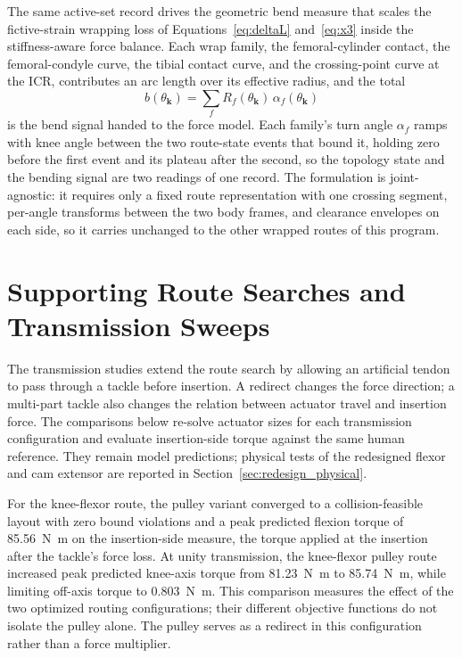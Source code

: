 The same active-set record drives the geometric bend measure that scales the fictive-strain wrapping loss of Equations~\eqref{eq:deltaL} and~\eqref{eq:x3} inside the stiffness-aware force balance. Each wrap family, the femoral-cylinder contact, the femoral-condyle curve, the tibial contact curve, and the crossing-point curve at the ICR, contributes an arc length over its effective radius, and the total
\begin{equation}
b(\theta_{\mathbf{k}}) = \sum_{f} R_{f}(\theta_{\mathbf{k}})\, \alpha_{f}(\theta_{\mathbf{k}})
\label{eq:app_bend_measure}
\end{equation}
is the bend signal handed to the force model. Each family's turn angle $\alpha_{f}$ ramps with knee angle between the two route-state events that bound it, holding zero before the first event and its plateau after the second, so the topology state and the bending signal are two readings of one record. The formulation is joint-agnostic: it requires only a fixed route representation with one crossing segment, per-angle transforms between the two body frames, and clearance envelopes on each side, so it carries unchanged to the other wrapped routes of this program.

\section{Supporting Route Searches and Transmission Sweeps}\label{sec:app_routing_extensions}

The transmission studies extend the route search by allowing an artificial tendon to pass through a tackle before insertion. A redirect changes the force direction; a multi-part tackle also changes the relation between actuator travel and insertion force. The comparisons below re-solve actuator sizes for each transmission configuration and evaluate insertion-side torque against the same human reference. They remain model predictions; physical tests of the redesigned flexor and cam extensor are reported in Section~\ref{sec:redesign_physical}.

For the knee-flexor route, the pulley variant converged to a collision-feasible layout with zero bound violations and a peak predicted flexion torque of \qty{85.56}{\newton\meter} on the insertion-side measure, the torque applied at the insertion after the tackle's force loss. At unity transmission, the knee-flexor pulley route increased peak predicted knee-axis torque from \qty{81.23}{\newton\meter} to \qty{85.74}{\newton\meter}, while limiting off-axis torque to \qty{0.803}{\newton\meter}. This comparison measures the effect of the two optimized routing configurations; their different objective functions do not isolate the pulley alone. The pulley serves as a redirect in this configuration rather than a force multiplier.


